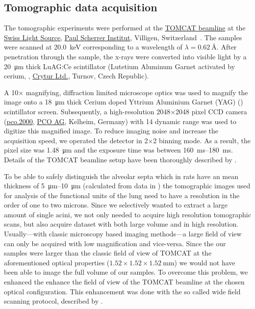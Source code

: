 \documentclass[%
	paper=a4,%
	abstract=true,%
	]{scrartcl}
\begin{document}
\subsection{Tomographic data acquisition\label{sec:tomcat}}
The tomographic experiments were performed at the \href{http://www.psi.ch/sls/tomcat/}{TOMCAT beamline} at the \href{http://www.psi.ch/sls/}{Swiss Light Source}, \href{http://www.psi.ch/}{Paul Scherrer Institut}, Villigen, Switzerland~\cite{Stampanoni2006a}. The samples were scanned at \SI{20.0}{\kilo\electronvolt} corresponding to a wavelength of \(\lambda=\SI{0.62}{\angstrom}\). %
After penetration through the sample, the x-rays were converted into visible light by a \SI{20}{\micro\meter} thick LuAG:Ce scintillator (Lutetium Aluminum Garnet activated by cerium, , \href{http://www.crytur.cz/}{Crytur Ltd.}, Turnov, Czech Republic).

A 10\(\times\) magnifying, diffraction limited microscope optics was used to magnify the image onto a \SI{18}{\micro\meter} thick Cerium doped Yttrium Aluminium Garnet (YAG) () scintillator screen. Subsequently, a high-resolution 2048\(\times\)2048 pixel CCD camera (\href{http://www.pco.de/sensitive-cameras/pco2000/}{pco.2000}, \href{http://www.pco.de/}{PCO AG}, Kelheim, Germany) with \SI{14}{\bit} dynamic range was used to digitize this magnified image. To reduce imaging noise and increase the acquisition speed, we operated the detector in 2\(\times\)2 binning mode. As a result, the pixel size was \SI{1.48}{\micro\meter} and the exposure time was between \SIrange{160}{180}{\milli\second}. Details of the TOMCAT beamline setup have been thoroughly described by \citet{Stampanoni2006a}.

To be able to safely distinguish the alveolar septa which in rats have an mean thickness of \SIrange{5}{10}{\micro\meter} (calculated from data in \citet{Burri1974}) the tomographic images used for analysis of the functional units of the lung need to have a resolution in the order of one to two microns. Since we selectively wanted to extract a large amount of single acini, we not only needed to acquire high resolution tomographic scans, but also acquire dataset with both large volume and in high resolution. Usually---with classic microscopy based imaging methods---a large field of view can only be acquired with low magnification and vice-versa. Since the our samples were larger than the classic field of view of TOMCAT at the aforementioned optical properties (\(1.52\times1.52\times\SI{1.52}{\milli\meter}\)) we would not have been able to image the full volume of our samples. To overcome this problem, we enhanced the enhance the field of view of the TOMCAT beamline at the chosen optical configuration. This enhancement was done with the so called wide field scanning protocol, described by \citet{Haberthuer2010}.
\end{document}
